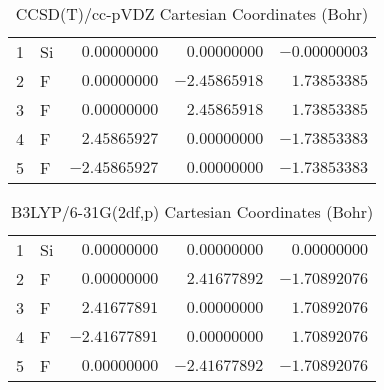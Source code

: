 \documentclass[10pt,oneside]{article}
\begin{document}
\begin{table}[h!]
\centering
\caption{CCSD(T)/cc-pVDZ Cartesian Coordinates (Bohr)}
\begin{tabular}{llrrr}
1  & Si & $ 0.00000000$ & $ 0.00000000$ & $-0.00000003$ \\
2  & F  & $ 0.00000000$ & $-2.45865918$ & $ 1.73853385$ \\
3  & F  & $ 0.00000000$ & $ 2.45865918$ & $ 1.73853385$ \\
4  & F  & $ 2.45865927$ & $ 0.00000000$ & $-1.73853383$ \\
5  & F  & $-2.45865927$ & $ 0.00000000$ & $-1.73853383$ \\
\end{tabular}
\end{table}

\begin{table}[h!]
\centering
\caption{B3LYP/6-31G(2df,p) Cartesian Coordinates (Bohr)}
\begin{tabular}{llrrr}
1  & Si & $ 0.00000000$ & $ 0.00000000$ & $ 0.00000000$ \\
2  & F  & $ 0.00000000$ & $ 2.41677892$ & $-1.70892076$ \\
3  & F  & $ 2.41677891$ & $ 0.00000000$ & $ 1.70892076$ \\
4  & F  & $-2.41677891$ & $ 0.00000000$ & $ 1.70892076$ \\
5  & F  & $ 0.00000000$ & $-2.41677892$ & $-1.70892076$ \\
\end{tabular}
\end{table}

\clearpage
\end{document}
